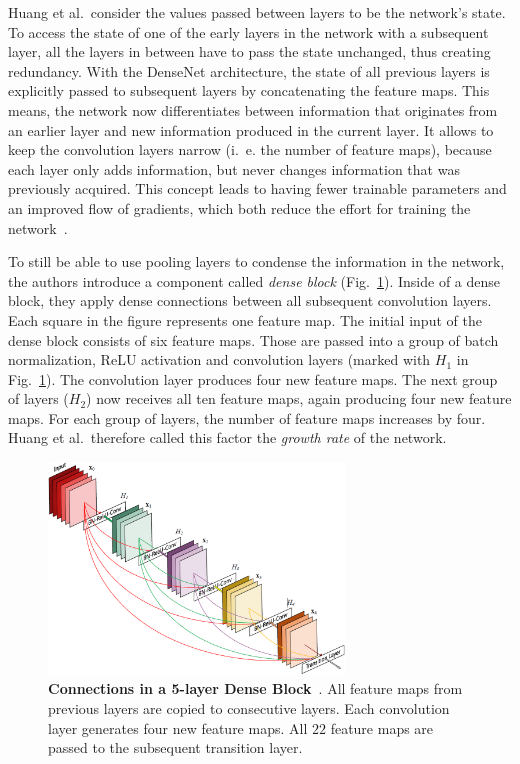 Huang et al.\ consider the values passed between layers to be the network's state. To access the state of one of the early layers in the network with a subsequent layer, all the layers in between have to pass the state unchanged, thus creating redundancy. With the DenseNet architecture, the state of all previous layers is explicitly passed to subsequent layers by concatenating the feature maps. This means, the network now differentiates between information that originates from an earlier layer and new information produced in the current layer. It allows to keep the convolution layers narrow (i.~e. the number of feature maps), because each layer only adds information, but never changes information that was previously acquired. This concept leads to having fewer trainable parameters and an improved flow of gradients, which both reduce the effort for training the network~\cite{densenet17}.

To still be able to use pooling layers to condense the information in the network, the authors introduce a component called \emph{dense block} (Fig.~\ref{fig:dense_block}). Inside of a dense block, they apply dense connections between all subsequent convolution layers. Each square in the figure represents one feature map. The initial input of the dense block consists of six feature maps. Those are passed into a group of batch normalization, ReLU activation and convolution layers (marked with $H_1$ in Fig.~\ref{fig:dense_block}). The convolution layer produces four new feature maps. The next group of layers ($H_2$) now receives all ten feature maps, again producing four new feature maps. For each group of layers, the number of feature maps increases by four. Huang et al.\ therefore called this factor the \emph{growth rate} of the network.

\begin{figure}[h]
    \centering
    \includegraphics[width=0.7\textwidth]{images/dense-net-architecture}
    \caption[Connections in a 5-layer Dense Block]
    {\textbf{Connections in a 5-layer Dense Block}~\cite{densenet17}. All feature maps from previous layers are copied to consecutive layers. Each convolution layer generates four new feature maps. All $22$ feature maps are passed to the subsequent transition layer.}
    \label{fig:dense_block}
\end{figure}

